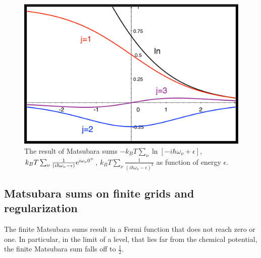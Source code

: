 \documentclass[11pt,a4paper]{report}
\begin{document}
\begin{figure}[h!]
\begin{center}
\includegraphics[width=0.8\linewidth,clip=true]
{Figs/Matsubarasums/matsubarasums1.eps}
\end{center}
\caption{\label{fig:matsubarasums} The result of Matsubara sums
  $-k_BT\sum_\nu\ln[-i\hbar\omega_\nu+\epsilon]$, $k_BT\sum_\nu
  \frac{1}{(i\hbar\omega_\nu-\epsilon)}\mathrm{e}^{i\omega_\nu 0^+}$,
$k_BT\sum_\nu \frac{1}{(i\hbar\omega_\nu-\epsilon)^2}$ as
  function of energy $\epsilon$.}
\end{figure}



\subsection{Matsubara sums on finite grids and regularization}
The finite Matsubara sums result in a Fermi function that does not
reach zero or one. In particular, in the limit of a level, that lies
far from the chemical potential, the finite Matsubara sum falls off to
$\frac{1}{2}$.
\end{document}
